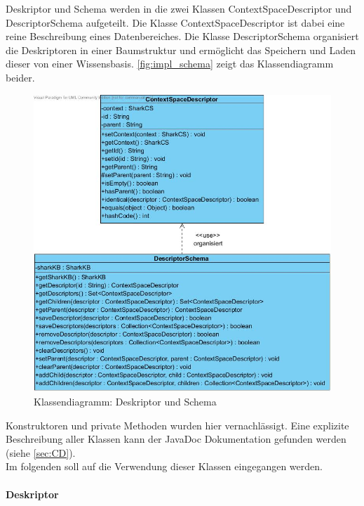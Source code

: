 \documentclass[a4paper]{article}
\begin{document}
	Deskriptor und Schema werden in die zwei Klassen ContextSpaceDescriptor
	und DescriptorSchema aufgeteilt. Die Klasse ContextSpaceDescriptor ist dabei
	eine reine Beschreibung eines Datenbereiches. Die Klasse DescriptorSchema
	organisiert die Deskriptoren in einer Baumstruktur und ermöglicht das
	Speichern und Laden dieser von einer Wissensbasis. \autoref{fig:impl_schema}
	zeigt das Klassendiagramm beider.
	
	\begin{figure}[H]
		\centerline{
			\includegraphics[scale=0.53]{../Bilder/impl_schema.jpg}
		}
		\caption{Klassendiagramm: Deskriptor und Schema}
		\label{fig:impl_schema}
	\end{figure}	
	
	Konstruktoren und private Methoden wurden hier vernachlässigt. Eine
	explizite Beschreibung aller Klassen kann der JavaDoc Dokumentation gefunden
	werden (siehe \autoref{sec:CD}). \\
	
	Im folgenden soll auf die Verwendung dieser Klassen eingegangen werden.
		
	\paragraph{Deskriptor}\mbox{} \\
	
\end{document}
